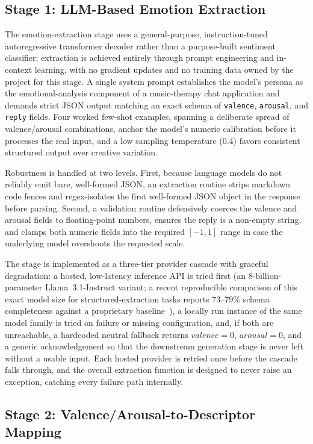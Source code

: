 \documentclass[11pt]{article}
\begin{document}
\subsection{Stage 1: LLM-Based Emotion Extraction}

The emotion-extraction stage uses a general-purpose, instruction-tuned autoregressive transformer decoder rather than a purpose-built sentiment classifier; extraction is achieved entirely through prompt engineering and in-context learning, with no gradient updates and no training data owned by the project for this stage. A single system prompt establishes the model's persona as the emotional-analysis component of a music-therapy chat application and demands strict JSON output matching an exact schema of \texttt{valence}, \texttt{arousal}, and \texttt{reply} fields. Four worked few-shot examples, spanning a deliberate spread of valence/arousal combinations, anchor the model's numeric calibration before it processes the real input, and a low sampling temperature (0.4) favors consistent structured output over creative variation.

Robustness is handled at two levels. First, because language models do not reliably emit bare, well-formed JSON, an extraction routine strips markdown code fences and regex-isolates the first well-formed JSON object in the response before parsing. Second, a validation routine defensively coerces the valence and arousal fields to floating-point numbers, ensures the reply is a non-empty string, and clamps both numeric fields into the required $[-1,1]$ range in case the underlying model overshoots the requested scale.

The stage is implemented as a three-tier provider cascade with graceful degradation: a hosted, low-latency inference API is tried first (an 8-billion-parameter Llama~3.1-Instruct variant; a recent reproducible comparison of this exact model size for structured-extraction tasks reports 73--79\% schema completeness against a proprietary baseline~\cite{nawalny2025llmextraction}), a locally run instance of the same model family is tried on failure or missing configuration, and, if both are unreachable, a hardcoded neutral fallback returns $valence=0$, $arousal=0$, and a generic acknowledgement so that the downstream generation stage is never left without a usable input. Each hosted provider is retried once before the cascade falls through, and the overall extraction function is designed to never raise an exception, catching every failure path internally.

\subsection{Stage 2: Valence/Arousal-to-Descriptor Mapping}
\end{document}
